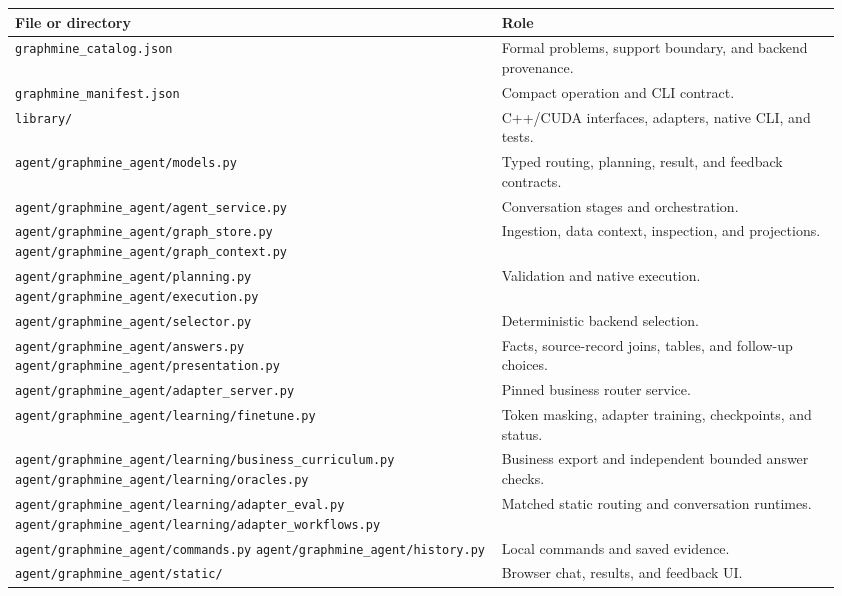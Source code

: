 \documentclass[11pt,a4paper]{article}
\newcommand{\pathref}[1]{\nolinkurl{#1}}
\begin{document}
\begin{longtable}{@{}P{0.57\linewidth}P{0.39\linewidth}@{}}
\toprule
File or directory & Role \\
\midrule
\endhead
\pathref{graphmine_catalog.json} & Formal problems, support boundary, and backend
provenance. \\
\pathref{graphmine_manifest.json} & Compact operation and CLI contract. \\
\pathref{library/} & C++/CUDA interfaces, adapters, native CLI, and tests. \\
\pathref{agent/graphmine_agent/models.py} & Typed routing, planning, result, and
feedback contracts. \\
\pathref{agent/graphmine_agent/agent_service.py} & Conversation stages and
orchestration. \\
\pathref{agent/graphmine_agent/graph_store.py}\newline
\pathref{agent/graphmine_agent/graph_context.py} & Ingestion, data context,
inspection, and projections. \\
\pathref{agent/graphmine_agent/planning.py}\newline
\pathref{agent/graphmine_agent/execution.py} & Validation and native execution. \\
\pathref{agent/graphmine_agent/selector.py} & Deterministic backend selection. \\
\pathref{agent/graphmine_agent/answers.py}\newline
\pathref{agent/graphmine_agent/presentation.py} & Facts, source-record joins,
tables, and follow-up choices. \\
\pathref{agent/graphmine_agent/adapter_server.py} & Pinned business router service. \\
\pathref{agent/graphmine_agent/learning/finetune.py} & Token masking, adapter
training, checkpoints, and status. \\
\pathref{agent/graphmine_agent/learning/business_curriculum.py}\newline
\pathref{agent/graphmine_agent/learning/oracles.py} & Business export and independent
bounded answer checks. \\
\pathref{agent/graphmine_agent/learning/adapter_eval.py}\newline
\pathref{agent/graphmine_agent/learning/adapter_workflows.py} & Matched static routing
and conversation runtimes. \\
\pathref{agent/graphmine_agent/commands.py}\newline
\pathref{agent/graphmine_agent/history.py} & Local commands and saved evidence. \\
\pathref{agent/graphmine_agent/static/} & Browser chat, results, and feedback UI. \\
\bottomrule
\end{longtable}
\end{document}
